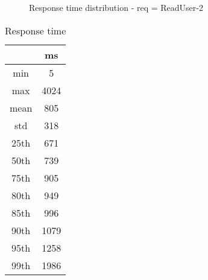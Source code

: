\begin{minipage}{0.75\linewidth}
\begin{figure}[h]
\begin{adjustbox}{max width=1.0\linewidth, keepaspectratio}
  \end{adjustbox}
  \caption{Response time distribution - req = ReadUser-2}
\end{figure}
\end{minipage}\hfill\begin{minipage}{0.18\linewidth}
\begin{table}[h]
\begin{tabular}{|cc|}
\hline
\textbf{} & \textbf{ms}\\ \hline
 \Xhline{0.005\arrayrulewidth}
min & 5\\
 \Xhline{0.005\arrayrulewidth}
max & 4024\\
 \Xhline{0.005\arrayrulewidth}
mean & 805\\
 \Xhline{0.005\arrayrulewidth}
std & 318\\
\hline
\hline
 \Xhline{0.005\arrayrulewidth}
25th & 671\\
 \Xhline{0.005\arrayrulewidth}
50th & 739\\
 \Xhline{0.005\arrayrulewidth}
75th & 905\\
 \Xhline{0.005\arrayrulewidth}
80th & 949\\
 \Xhline{0.005\arrayrulewidth}
85th & 996\\
 \Xhline{0.005\arrayrulewidth}
90th & 1079\\
 \Xhline{0.005\arrayrulewidth}
95th & 1258\\
 \Xhline{0.005\arrayrulewidth}
99th & 1986\\
\hline
\end{tabular}
\caption{Response time}
\end{table}
\end{minipage}\hfill